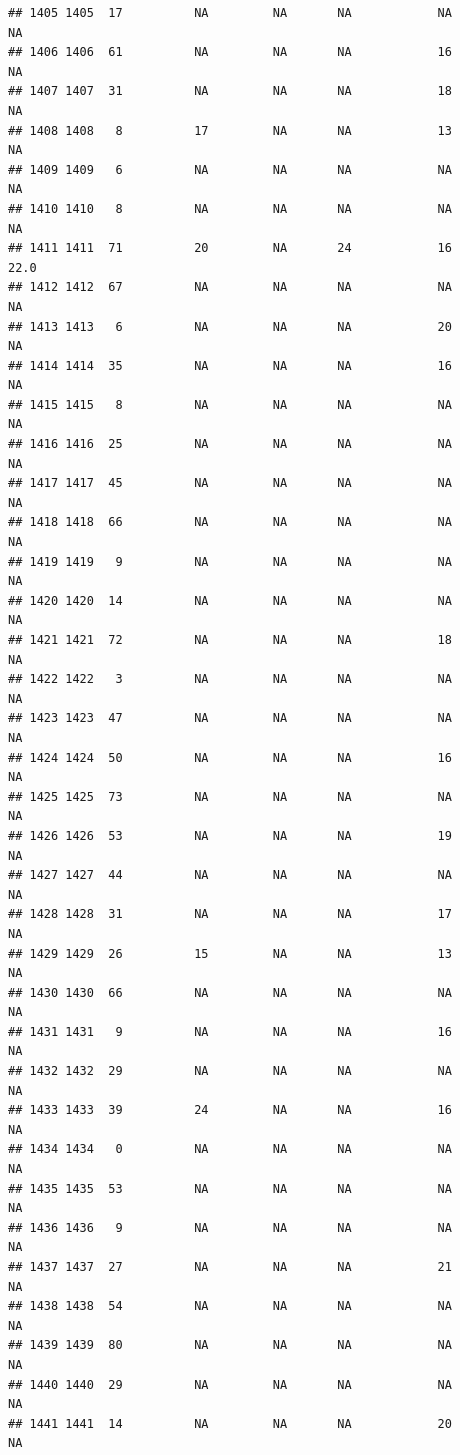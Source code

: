 \documentclass[man]{apa6}
\begin{document}
\begin{verbatim}
## 1405 1405  17          NA         NA       NA            NA       NA
## 1406 1406  61          NA         NA       NA            16       NA
## 1407 1407  31          NA         NA       NA            18       NA
## 1408 1408   8          17         NA       NA            13       NA
## 1409 1409   6          NA         NA       NA            NA       NA
## 1410 1410   8          NA         NA       NA            NA       NA
## 1411 1411  71          20         NA       24            16     22.0
## 1412 1412  67          NA         NA       NA            NA       NA
## 1413 1413   6          NA         NA       NA            20       NA
## 1414 1414  35          NA         NA       NA            16       NA
## 1415 1415   8          NA         NA       NA            NA       NA
## 1416 1416  25          NA         NA       NA            NA       NA
## 1417 1417  45          NA         NA       NA            NA       NA
## 1418 1418  66          NA         NA       NA            NA       NA
## 1419 1419   9          NA         NA       NA            NA       NA
## 1420 1420  14          NA         NA       NA            NA       NA
## 1421 1421  72          NA         NA       NA            18       NA
## 1422 1422   3          NA         NA       NA            NA       NA
## 1423 1423  47          NA         NA       NA            NA       NA
## 1424 1424  50          NA         NA       NA            16       NA
## 1425 1425  73          NA         NA       NA            NA       NA
## 1426 1426  53          NA         NA       NA            19       NA
## 1427 1427  44          NA         NA       NA            NA       NA
## 1428 1428  31          NA         NA       NA            17       NA
## 1429 1429  26          15         NA       NA            13       NA
## 1430 1430  66          NA         NA       NA            NA       NA
## 1431 1431   9          NA         NA       NA            16       NA
## 1432 1432  29          NA         NA       NA            NA       NA
## 1433 1433  39          24         NA       NA            16       NA
## 1434 1434   0          NA         NA       NA            NA       NA
## 1435 1435  53          NA         NA       NA            NA       NA
## 1436 1436   9          NA         NA       NA            NA       NA
## 1437 1437  27          NA         NA       NA            21       NA
## 1438 1438  54          NA         NA       NA            NA       NA
## 1439 1439  80          NA         NA       NA            NA       NA
## 1440 1440  29          NA         NA       NA            NA       NA
## 1441 1441  14          NA         NA       NA            20       NA

\end{verbatim}
\end{document}
